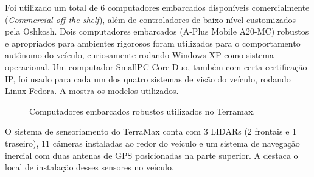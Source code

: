 Foi utilizado um total de 6 computadores embarcados disponíveis comercialmente (\emph{Commercial off-the-shelf}), além de controladores de baixo nível customizados pela Oshkosh. Dois computadores embarcados (A-Plus Mobile A20-MC) robustos e apropriados para ambientes rigorosos foram utilizados para o comportamento autônomo do veículo, curiosamente rodando Windows XP como sistema operacional. Um computador SmallPC Core Duo, também com certa certificação IP, foi usado para cada um dos quatro sistemas de visão do veículo, rodando Linux Fedora. A  mostra os modelos utilizados.

\begin{figure}[h]
\centering
{}\quad
{}
\caption{Computadores embarcados robustos utilizados no Terramax.}%
\label{fig:computadores}%
\end{figure}

O sistema de sensoriamento do TerraMax conta com 3 LIDARs (2 frontais e 1 traseiro), 11 câmeras instaladas ao redor do veículo e um sistema de navegação inercial com duas antenas de GPS posicionadas na parte superior. A  destaca o local de instalação desses sensores no veículo.

